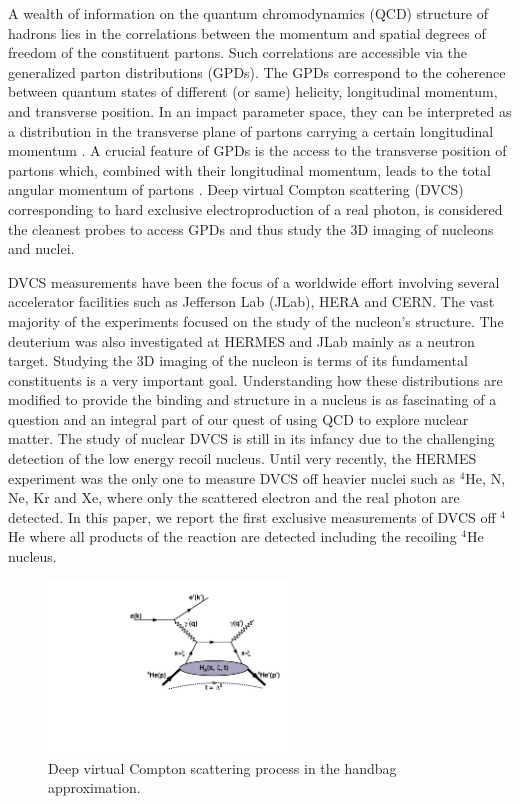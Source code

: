 \documentclass[nofootinbib,twocolumn,showpacs,prl,superscriptaddress,secnumarabic,amssymb,nobibnotes,aps,floatfix]{revtex4}
\begin{document}
A wealth of information on the quantum chromodynamics (QCD) structure of hadrons lies in the correlations between the momentum and spatial degrees of freedom of the constituent partons. Such correlations are accessible via the generalized parton distributions (GPDs). The GPDs correspond to the coherence between quantum states of different (or same) helicity, longitudinal momentum, and transverse position. In an impact parameter space, they can be interpreted as a distribution in the transverse plane of partons carrying a certain longitudinal momentum \cite{Burkardt:2000za,Diehl:2002he,Belitsky:2002ep}. A crucial feature of GPDs is the access to the transverse position of partons which, combined with their longitudinal momentum, leads to the total angular momentum of partons \cite{Burkardt:2005hp}. Deep virtual Compton scattering (DVCS) corresponding to hard exclusive electroproduction of a real photon, is considered the cleanest probes to access GPDs and thus study the 3D imaging of nucleons and nuclei.

DVCS measurements have been the focus of a worldwide effort \cite{Stepanyan:2001sm,Airapetian,Chekanov:2003ya,Aktas:2005ty,Chen:2006na,Munoz Camacho:2006hx,Girod:2007aa,Gavalian:2009,Seder:2015,Pisano:2015,Jo:2015ema} involving several accelerator facilities such as Jefferson Lab (JLab), HERA and  CERN. The vast majority of the experiments focused on the study of the nucleon's structure. The deuterium was also investigated at HERMES and JLab \cite{Mazouz:2007aa} mainly as a neutron target. Studying the 3D imaging of the nucleon is terms of its fundamental constituents is a very important goal. Understanding how these distributions are modified to provide the binding and structure in a nucleus is as fascinating of a question and an integral part of our quest of using QCD to explore nuclear matter. The study of nuclear DVCS is still in its infancy due to the challenging detection of the low energy recoil nucleus. Until very recently, the HERMES experiment \cite{Ellinghaus:2002zw} was the only one to measure DVCS off heavier nuclei such as $^4$He, N, Ne, Kr and Xe, where only the scattered electron and the real photon are detected. In this paper, we report the first exclusive measurements of DVCS off $^4$He where all products of the reaction are detected including the recoiling $^4$He nucleus.



\begin{figure}[tb]
\includegraphics[width=6.5cm]{figs/DVCS_diagram.pdf}
\vspace{-0.cm}
\caption{Deep virtual Compton scattering process in the handbag approximation.}
\label{fig:diags}
\end{figure}
\end{document}
